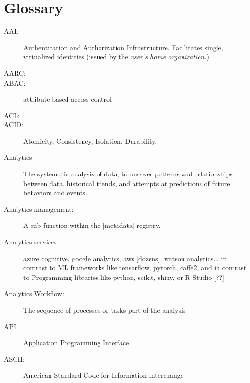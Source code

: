 \section* {Glossary}

\begin{description}

  
\item[AAI:] Authentication and Authorization
  Infrastructure. Facilitates single, virtualized identities (issued
  by the {\em user’s home organization.})

\item[AARC:]     

\item[ABAC:] attribute based access control

\item[ACL:] 

\item[ACID:] Atomicity, Consistency, Isolation, Durability.

\item[Analytics:] The systematic analysis of data, to uncover patterns
  and relationships between data, historical trends, and attempts at
  predictions of future behaviors and events.

\item[Analytics management:] A sub function within the [metadata]
  registry.

\item[Analytics services] azure cognitive, google analytics, aws
  [dozens], watson analytics... in contrast to ML frameworks like
  tensorflow, pytorch, caffe2, and in contrast to Programming
  libraries like python, scikit, shiny, or R Studio [??]


\item[Analytics Workflow:] The sequence of processes or tasks part of
  the analysis

\item[API:] Application Programming Interface

\item[ASCII:] American Standard Code for Information Interchange


\end{description}
